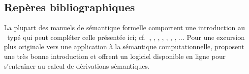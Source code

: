 \subsection*{Repères bibliographiques}
La plupart des manuels de sémantique formelle comportent une introduction au \lcalcul\ typé qui peut compléter celle présentée ici; cf.\ \citet[][chap.~4]{DWP:81}, \citet[chap.~7]{ChierchiaMcCG:90}, \citet[][chap.~13]{PtMW:90}, \citet[][chap.~4]{Gamut:2}, \citet[][chap.~4 \& 5]{Cann:94}, \citet[][chap.~2]{HeimKratzer:97}, \citet[][chap.~9]{Jacobson:14}, \citet[][chap.~3]{Winter:16}...  Pour une excursion plus originale vers une application à la sémantique computationnelle, \citet{BlackburnBos:2005} proposent  une très bonne introduction et \citet{lambdacalc} offrent un logiciel disponible en ligne pour s'entraîner au calcul de dérivations sémantiques.




\fussy
